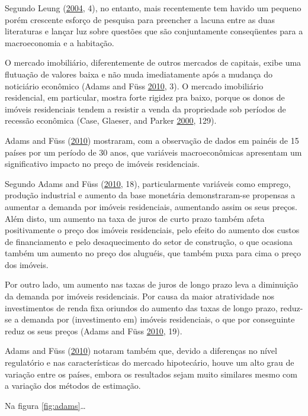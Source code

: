 \documentclass[
	12pt,				%
	oneside,			%
	a4paper,			%
	chapter=TITLE,		%
	section=TITLE,		%
	english,			%
	brazil				%
	]{abntex2}
\begin{document}
Segundo Leung (\protect\hyperlink{ref-LEUNG}{2004}, 4), no entanto, mais recentemente tem havido um pequeno porém
crescente esforço de pesquisa para preencher a lacuna entre as duas literaturas
e lançar luz sobre questões que são conjuntamente conseqüentes para a
macroeconomia e a habitação.

O mercado imobiliário, diferentemente de outros mercados de capitais, exibe uma
flutuação de valores baixa e não muda imediatamente após a mudança do noticiário
econômico (Adams and Füss \protect\hyperlink{ref-ADAMS201038}{2010}, 3). O mercado imobiliário residencial, em particular,
mostra forte rigidez pra baixo, porque os donos de imóveis residenciais tendem
a resistir a venda da propriedade sob períodos de recessão econômica (Case, Glaeser, and Parker \protect\hyperlink{ref-Case2000}{2000}, 129).

Adams and Füss (\protect\hyperlink{ref-ADAMS201038}{2010}) mostraram, com a observação de dados em painéis de 15 países por um
período de 30 anos, que variáveis macroeconômicas apresentam um significativo
impacto no preço de imóveis residenciais.

Segundo Adams and Füss (\protect\hyperlink{ref-ADAMS201038}{2010}, 18), particularmente variáveis como
emprego, produção industrial e aumento da base monetária demonstraram-se
propensas a aumentar a demanda por imóveis residenciais, aumentando assim os
seus preços. Além disto, um aumento na taxa de juros de curto prazo também
afeta positivamente o preço dos imóveis residenciais, pelo efeito do aumento dos
custos de financiamento e pelo desaquecimento do setor de construção, o que
ocasiona também um aumento no preço dos aluguéis, que também puxa para cima
o preço dos imóveis.

Por outro lado, um aumento nas taxas de juros de longo prazo leva a diminuição
da demanda por imóveis residenciais. Por causa da maior atratividade nos
investimentos de renda fixa oriundos do aumento das taxas de longo prazo,
reduz-se a demanda por (investimento em) imóveis residenciais, o que
por conseguinte reduz os seus preços (Adams and Füss \protect\hyperlink{ref-ADAMS201038}{2010}, 19).

Adams and Füss (\protect\hyperlink{ref-ADAMS201038}{2010}) notaram também que, devido a diferenças no nível regulatório e nas
características do mercado hipotecário, houve um alto grau de variação entre os
países, embora os resultados sejam muito similares mesmo com a variação dos
métodos de estimação.

Na figura \ref{fig:adams}\ldots{}
\end{document}
